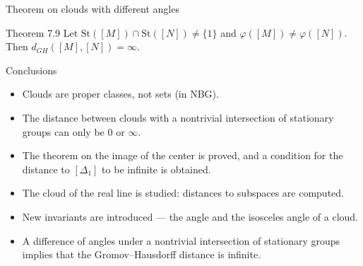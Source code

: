 \documentclass[12pt]{beamer}
\begin{document}
\begin{frame}{Theorem on clouds with different angles}
  \begin{block}{Theorem 7.9}
    Let $\mathrm{St}([M])\cap\mathrm{St}([N])\neq\{1\}$ and
    $\varphi([M])\neq\varphi([N])$. Then $d_{GH}([M],[N])=\infty$.
  \end{block}
\end{frame}

\begin{frame}{Conclusions}
  \begin{itemize}
    \item Clouds are proper classes, not sets (in NBG).
    \item The distance between clouds with a nontrivial intersection of
      stationary groups can only be $0$ or $\infty$.
    \item The theorem on the image of the center is proved, and a condition
      for the distance to $[\Delta_1]$ to be infinite is obtained.
    \item The cloud of the real line is studied: distances to subspaces
      are computed.
    \item New invariants are introduced --- the angle and the isosceles
      angle of a cloud.
    \item A difference of angles under a nontrivial intersection
      of stationary
      groups implies that the Gromov--Hausdorff distance is infinite.
  \end{itemize}
\end{frame}
\nocite{*}
\printbibliography
\end{document}
